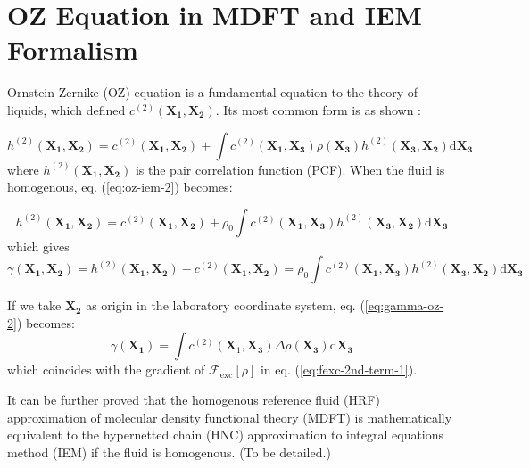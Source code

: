 \section{OZ Equation in MDFT and IEM Formalism}

Ornstein-Zernike (OZ) equation is a fundamental equation to the theory
of liquids, which defined $c^{(2)}(\mathbf{X_{1}},\mathbf{X_{2}})$.
Its most common form is as shown \citep{Hensen-McDonald}:

\begin{equation}
h^{(2)}(\mathbf{X_{1}},\mathbf{X_{2}})=c^{(2)}(\mathbf{X_{1}},\mathbf{X_{2}})+\int c^{(2)}(\mathbf{X_{1}},\mathbf{X_{3}})\rho(\mathbf{X_{3}})h^{(2)}(\mathbf{X_{3}},\mathbf{X_{2}})\mathrm{d}\mathbf{X_{3}}\label{eq:oz-iem-2}
\end{equation}
where $h^{(2)}(\mathbf{X_{1}},\mathbf{X_{2}})$ is the pair correlation
function (PCF). When the fluid is homogenous, eq. (\ref{eq:oz-iem-2})
becomes:

\begin{equation}
h^{(2)}(\mathbf{X_{1}},\mathbf{X_{2}})=c^{(2)}(\mathbf{X_{1}},\mathbf{X_{2}})+\rho_{0}\int c^{(2)}(\mathbf{X_{1}},\mathbf{X_{3}})h^{(2)}(\mathbf{X_{3}},\mathbf{X_{2}})\mathrm{d}\mathbf{X_{3}}\label{eq:oz-iem-1-1}
\end{equation}
which gives 
\begin{equation}
\gamma(\mathbf{X_{1}},\mathbf{X_{2}})=h^{(2)}(\mathbf{X_{1}},\mathbf{X_{2}})-c^{(2)}(\mathbf{X_{1}},\mathbf{X_{2}})=\rho_{0}\int c^{(2)}(\mathbf{X_{1}},\mathbf{X_{3}})h^{(2)}(\mathbf{X_{3}},\mathbf{X_{2}})\mathrm{d}\mathbf{X_{3}}\label{eq:gamma-oz-2}
\end{equation}


If we take $\mathbf{X_{2}}$ as origin in the laboratory coordinate
system, eq. (\ref{eq:gamma-oz-2}) becomes:
\begin{equation}
\gamma(\mathbf{X_{1}})=\int c^{(2)}(\mathbf{X}_{1},\mathbf{X_{3}})\Delta\rho(\mathbf{X_{3}})\mathrm{d}\mathbf{X_{3}}\label{eq:gamma-oz-1-1}
\end{equation}
which coincides with the gradient of $\mathcal{F}_{\mathrm{exc}}\left[\rho\right]$
in eq. (\ref{eq:fexc-2nd-term-1}).

It can be further proved that the homogenous reference fluid (HRF)
approximation of molecular density functional theory (MDFT) is mathematically
equivalent to the hypernetted chain (HNC) approximation to integral
equations method (IEM) if the fluid is homogenous. (To be detailed.)


